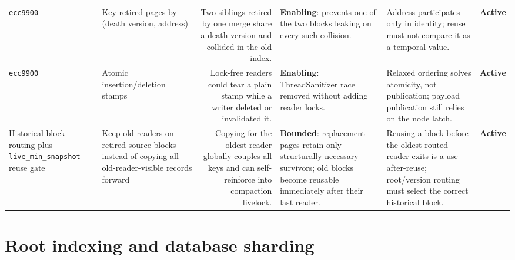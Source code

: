 \documentclass[10pt,a4paper,landscape]{article}
\newcommand{\code}[1]{\texttt{#1}}
\newcommand{\commit}[1]{\code{#1}}
\newcommand{\gainbounded}{\textbf{Bounded}}
\newcommand{\gainenabling}{\textbf{Enabling}}
\newcommand{\stateactive}{\textbf{Active}}
\begin{document}
\begin{longtable}{IORGKS}
\commit{ecc9900} & Key retired pages by (death version, address) & Two siblings retired by
one merge share a death version and collided in the old index. & \gainenabling: prevents one
of the two blocks leaking on every such collision. & Address participates only in
identity; reuse must not compare it as a temporal value. & \stateactive \\

\commit{ecc9900} & Atomic insertion/deletion stamps & Lock-free readers could tear a
plain stamp while a writer deleted or invalidated it. & \gainenabling: ThreadSanitizer race
removed without adding reader locks. & Relaxed ordering solves atomicity, not publication;
payload publication still relies on the node latch. & \stateactive \\

Historical-block routing plus \code{live\_min\_snapshot} reuse gate & Keep old readers on
retired source blocks instead of copying all old-reader-visible records forward & Copying
for the oldest reader globally couples all keys and can self-reinforce into compaction
livelock. & \gainbounded: replacement pages retain only structurally necessary survivors;
old blocks become reusable immediately after their last reader. & Reusing a block before
the oldest routed reader exits is a use-after-reuse; root/version routing must select the
correct historical block. & \stateactive \\
\bottomrule
\end{longtable}

\section{Root indexing and database sharding}
\end{document}
